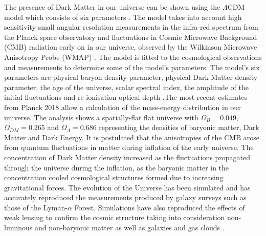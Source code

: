 \newline
The presence of Dark Matter in our universe can be shown using the $\Lambda$CDM model which consists of six parameters \cite{LCDMparam}. The model takes into account high sensitivity small angular resolution measurements in the infra-red spectrum from the Planck space observatory \cite{Planck2018} and fluctuations in Cosmic Microwave Background (CMB) radiation early on in our universe, observed by the Wilkinson Microwave Anisotropy Probe (WMAP) \cite{WMAP}. The model is fitted to the cosmological observations and measurements to determine some of the model's parameters.
The model's six parameters are physical baryon density parameter, physical Dark Matter density parameter, the age of the universe, scalar spectral index,  the amplitude of the initial fluctuations and re-ionisation optical depth \cite{LCDMparam}.The most recent estimates from Planck 2018 \cite{Planck2018} allow a calculation of the mass-energy distribution in our universe. The analysis shows a spatially-flat flat universe with $\Omega_B = 0.049$, $\Omega_{DM} = 0.265$ and $\Omega_\Lambda = 0.686$ representing the densities of baryonic matter, Dark Matter and Dark Energy. 
\newline
It is postulated that the anisotropies of the CMB arose from quantum fluctuations in matter during inflation of the early universe. The concentration of Dark Matter density increased as the fluctuations propagated through the universe during the inflation, as the baryonic matter in the concentration cooled cosmological structures formed due to increasing gravitational forces. The evolution of the Universe has been simulated and has accurately reproduced the measurements produced by galaxy surveys such as those of the Lyman-$\alpha$ Forest. Simulations have also reproduced the effects of weak lensing to confirm the cosmic structure taking into consideration non-luminous and non-baryonic matter as well as galaxies and gas clouds \cite{GravLens}. 